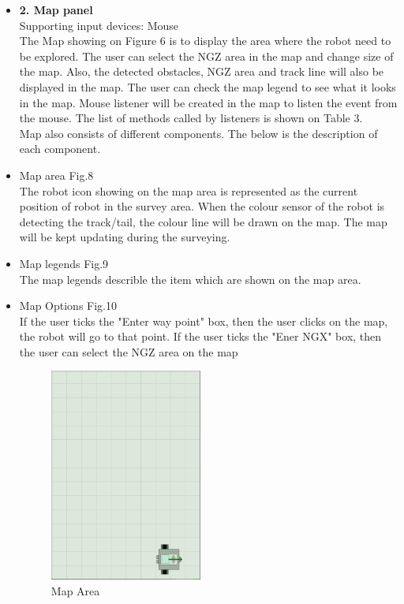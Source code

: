 \begin{itemize}
	\item \textbf{2. Map panel}\\
	Supporting input devices: Mouse\\
	The Map showing on Figure 6 is to display the area where the robot need to be explored. The user can select the NGZ area in the map and change size of the map. Also, the detected obstacles, NGZ area and track line will also be displayed in the map. The user can check the map legend to see what it looks in the map. Mouse listener will be created in the map to listen the event from the mouse. The list of methods called by listeners is shown on Table 3.\\
	Map also consists of different components. The below is the description of each component.
	\\
	\item Map area Fig.8\\
	The robot icon showing on the map area is represented as the current position of robot in the survey area. When the colour sensor of the robot is detecting the track/tail, the colour line will be drawn on the map. The map will be kept updating during the surveying.
	\\
	\item Map legends Fig.9\\
	The map legends describle the item which are shown on the map area.
	\\
	\item Map Options Fig.10\\
	If the user ticks the "Enter way point" box, then the user clicks on the map, the robot will go to that point. If the user ticks the "Ener NGX" box, then the user can select the NGZ area on the map
	
\begin{figure}[H]
	\includegraphics[width=50mm]{MapArea.PNG}  
	\caption{Map Area}
	\label{fig:Map Area}				
\end{figure}	


\end{itemize}
